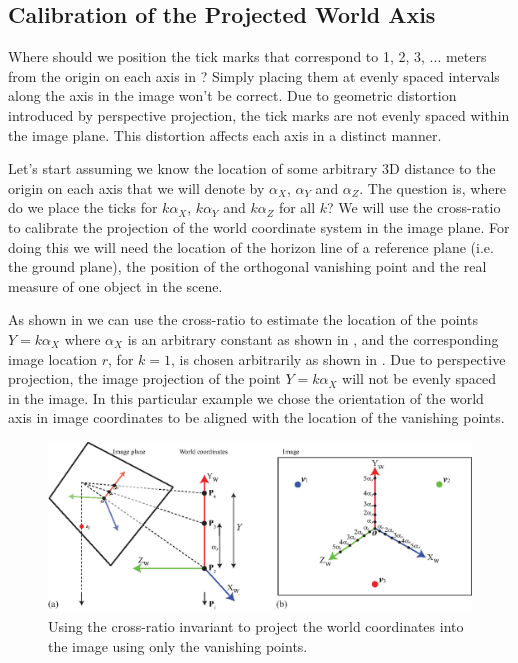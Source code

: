 \subsection{Calibration of the Projected World Axis}

Where should we position the tick marks that correspond to 1, 2, 3, ... meters from the origin on each axis in \fig{\ref{fig:office_world_calibration}}? Simply placing them at evenly spaced intervals along the axis in the image won't be correct. Due to geometric distortion introduced by perspective projection, the tick marks are not evenly spaced within the image plane. This distortion affects each axis in a distinct manner.

Let's start assuming we know the location of some arbitrary 3D distance to the origin on each axis that we will denote by $\alpha_X$, $\alpha_Y$ and $\alpha_Z$. The question is, where do we place the ticks for $k\alpha_X$, $k\alpha_Y$ and $k\alpha_Z$ for all $k$? We will use the cross-ratio to calibrate the projection of the world coordinate system in the image plane. For doing this we will need the location of the horizon line of a reference plane (i.e. the ground plane), the position of the orthogonal vanishing point and the real measure of one object in the scene. 


As shown in  we can use the cross-ratio to estimate the location of the points $Y= k \alpha_X$ where $\alpha_X$ is an arbitrary constant as shown in , and the corresponding image location $r$, for $k=1$, is chosen arbitrarily as shown in . Due to perspective projection, the image projection of the point $Y= k \alpha_X$ will not be evenly spaced in the image.  In this particular example we chose the orientation of the world axis in image coordinates to be aligned with the location of the vanishing points.

\begin{figure}[t]
\centerline{
\includegraphics[width=1\linewidth]{figures/single_view_3d/axis_calibration_procedure.eps}
} 
\caption{Using the cross-ratio invariant to project the world coordinates into the image using only the vanishing points.}
\label{fig:axis_calibration_procedure}
\end{figure}

